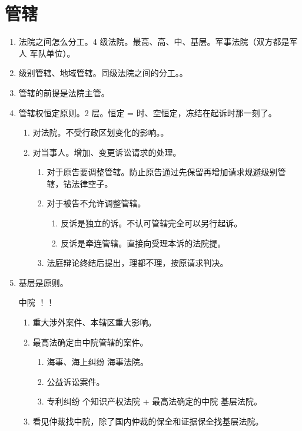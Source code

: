 \section{管辖}
\begin{enumerate}
  \item 法院之间怎么分工。4 级法院。最高、高、中、基层。军事法院（双方都是军人 \hz 军队单位）。
  \item 级别管辖、地域管辖。同级法院之间的分工。。
  \item 管辖的前提是法院主管。
  \item 管辖权恒定原则。2 层。恒定 = 时、空恒定，冻结在起诉时那一刻了。
        \begin{enumerate}
          \item 对法院。不受行政区划变化的影响。。
          \item 对当事人。增加、变更诉讼请求的处理。
                \begin{enumerate}
                  \item 对于原告要调整管辖。防止原告通过先保留再增加请求规避级别管辖，钻法律空子。
                  \item 对于被告不允许调整管辖。
                        \begin{enumerate}
                          \item 反诉是独立的诉。不认可管辖完全可以另行起诉。
                          \item 反诉是牵连管辖。直接向受理本诉的法院提。
                        \end{enumerate}
                  \item 法庭辩论终结后提出，理都不理，按原请求判决。
                \end{enumerate}
        \end{enumerate}
  \item 基层是原则。
        \begin{kk}{中院}
          ！！
          \begin{enumerate}
            \item 重大涉外案件、本辖区重大影响。
            \item 最高法确定由中院管辖的案件。
                  \begin{enumerate}
                    \item 海事、海上纠纷 \yjt 海事法院。
                    \item 公益诉讼案件。
                    \item 专利纠纷  个知识产权法院 + 最高法确定的中院 \hz 基层法院。
                  \end{enumerate}
            \item 看见仲裁找中院，除了国内仲裁的保全和证据保全找基层法院。
          \end{enumerate}
        \end{kk}


\end{enumerate}
